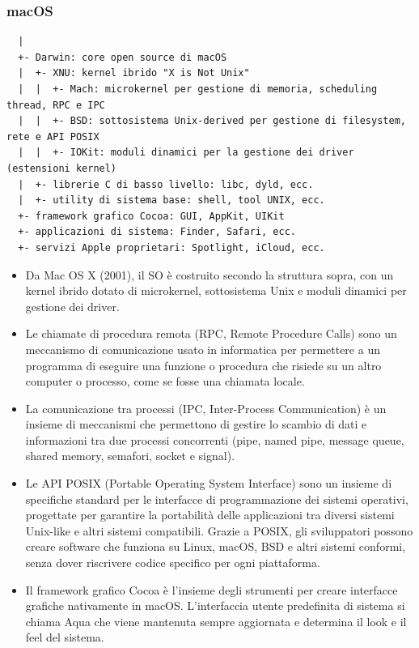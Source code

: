 \documentclass[a4paper]{article}
\begin{document}
\subsubsection*{macOS}
\vspace{-5pt}
\begin{verbatim}
  |
  +- Darwin: core open source di macOS
  |  +- XNU: kernel ibrido "X is Not Unix"
  |  |  +- Mach: microkernel per gestione di memoria, scheduling thread, RPC e IPC
  |  |  +- BSD: sottosistema Unix-derived per gestione di filesystem, rete e API POSIX
  |  |  +- IOKit: moduli dinamici per la gestione dei driver (estensioni kernel)
  |  +- librerie C di basso livello: libc, dyld, ecc.
  |  +- utility di sistema base: shell, tool UNIX, ecc.
  +- framework grafico Cocoa: GUI, AppKit, UIKit
  +- applicazioni di sistema: Finder, Safari, ecc.
  +- servizi Apple proprietari: Spotlight, iCloud, ecc.
\end{verbatim}

\begin{itemize}
	\item Da Mac OS X (2001), il SO è costruito secondo la struttura sopra, con un kernel ibrido dotato di microkernel,
	sottosistema Unix e moduli dinamici per gestione dei driver.
	\item Le chiamate di procedura remota (RPC, Remote Procedure Calls) sono un meccanismo di comunicazione usato in informatica
	per permettere a un programma di eseguire una funzione o procedura che risiede su un altro computer o processo, come se fosse
	una chiamata locale.
	\item La comunicazione tra processi (IPC, Inter-Process Communication) è un insieme di meccanismi che permettono di gestire
	lo scambio di dati e informazioni tra due processi concorrenti (pipe, named pipe, message queue, shared memory, semafori,
	socket e signal).
	\item Le API POSIX (Portable Operating System Interface) sono un insieme di specifiche standard per le interfacce di
	programmazione dei sistemi operativi, progettate per garantire la portabilità delle applicazioni tra diversi sistemi
	Unix-like e altri sistemi compatibili. Grazie a POSIX, gli sviluppatori possono creare software che funziona su Linux,
	macOS, BSD e altri sistemi conformi, senza dover riscrivere codice specifico per ogni piattaforma.
	\item Il framework grafico Cocoa è l'insieme degli strumenti per creare interfacce grafiche nativamente in macOS. L'interfaccia
	utente predefinita di sistema si chiama Aqua che viene mantenuta sempre aggiornata e determina il look e il feel del sistema.
\end{itemize}
\end{document}
